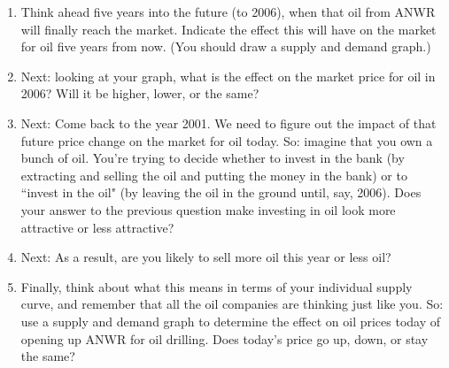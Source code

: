 \begin{enumerate}
    \begin{enumerate}
    \item Think ahead five years into the future (to 2006), when that oil from ANWR will finally reach the market. Indicate the effect this will have on the market for oil five years from now. (You should draw a supply and demand graph.)
    \item Next: looking at your graph, what is the effect on the market price for oil in 2006? Will it be higher, lower, or the same? %
    \item Next: Come back to the year 2001. We need to figure out the impact of that future price change on the market for oil today. So: imagine that you own a bunch of oil. You're trying to decide whether to invest in the bank (by extracting and selling the oil and putting the money in the bank) or to ``invest in the oil" (by leaving the oil in the ground until, say, 2006). Does your answer to the previous question make investing in oil look more attractive or less attractive? %
    \item Next: As a result, are you likely to sell more oil this year or less oil? %
    \item Finally, think about what this means in terms of your individual supply curve, and remember that all the oil companies are thinking just like you. So: use a supply and demand graph to determine the effect on oil prices today of opening up ANWR for oil drilling. Does today's price go up, down, or stay the same? %
    \end{enumerate}












\begin{comment}

\item \begin{EXAM} A few years ago a libertarian named Joel Grus came to class, and one of the things he discussed was drug legalization. So: for each item below, indicate the likely impact on the supply and demand for cocaine. Then indicate the effect on the equilibrium price and quantity. It may help to use a graph.


\end{comment}
\end{enumerate}
